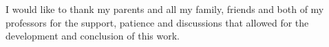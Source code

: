 
I would like to thank my parents and all my family, friends and both of my professors for the support, patience and discussions that allowed for the development and conclusion of this work.